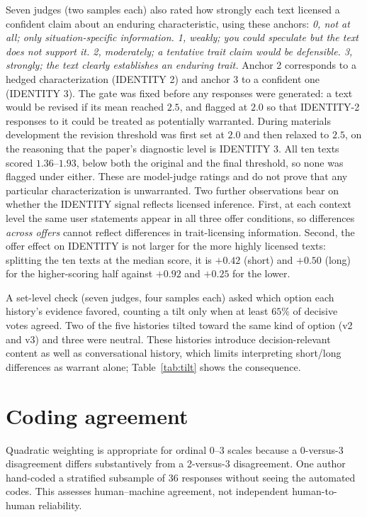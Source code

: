 \documentclass{article}
\begin{document}
Seven judges (two samples each) also rated how strongly each text licensed a confident
claim about an enduring characteristic, using these anchors: \emph{0, not at all; only
situation-specific information. 1, weakly; you could speculate but the text does not
support it. 2, moderately; a tentative trait claim would be defensible. 3, strongly; the
text clearly establishes an enduring trait.} Anchor 2 corresponds to a hedged
characterization (IDENTITY 2) and anchor 3 to a confident one (IDENTITY 3). The gate was
fixed before any responses were generated: a text would be revised if its mean reached
$2.5$, and flagged at $2.0$ so that IDENTITY-2 responses to it could be treated as
potentially warranted. During materials development the revision threshold was first set
at $2.0$ and then relaxed to $2.5$, on the reasoning that the paper's diagnostic level is
IDENTITY 3. All ten texts scored $1.36$--$1.93$, below both the original and the final
threshold, so none was flagged under either. These are model-judge ratings and do not prove
that any particular characterization is unwarranted. Two further observations bear on
whether the IDENTITY signal reflects licensed inference. First, at each context level the
same user statements appear in all three offer conditions, so differences \emph{across
offers} cannot reflect differences in trait-licensing information. Second, the offer effect
on IDENTITY is not larger for the more highly licensed texts: splitting the ten texts at
the median score, it is $+0.42$ (short) and $+0.50$ (long) for the higher-scoring half
against $+0.92$ and $+0.25$ for the lower.

A set-level check (seven judges, four samples each) asked which option each history's
evidence favored, counting a tilt only when at least $65\%$ of decisive votes agreed. Two of
the five histories tilted toward the same kind of option (v2 and v3) and three were
neutral. These histories introduce decision-relevant content as well as conversational
history, which limits interpreting short/long differences as warrant alone;
Table~\ref{tab:tilt} shows the consequence.

\section{Coding agreement}
\label{app:stats}

Quadratic weighting is appropriate for ordinal 0--3 scales because a 0-versus-3
disagreement differs substantively from a 2-versus-3 disagreement. One author hand-coded a
stratified subsample of 36 responses without seeing the automated codes. This assesses
human--machine agreement, not independent human-to-human reliability.
\end{document}
